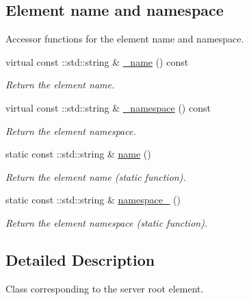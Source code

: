 \subsection*{Element name and namespace}
\label{_amgrpd4b5b61f6e07390f4af2465e04571f34}
Accessor functions for the element name and namespace. \begin{DoxyCompactItemize}
\item 
virtual const ::std::string \& \hyperlink{classopenstack_1_1xml_1_1Server___acbdfdc448bff8a494f3624eefa3484c5}{\_\-name} () const 
\begin{DoxyCompactList}\small\item\em Return the element name. \item\end{DoxyCompactList}\item 
virtual const ::std::string \& \hyperlink{classopenstack_1_1xml_1_1Server___accc402dc6fad597cadc73760b1fe778f}{\_\-namespace} () const 
\begin{DoxyCompactList}\small\item\em Return the element namespace. \item\end{DoxyCompactList}\item 
static const ::std::string \& \hyperlink{classopenstack_1_1xml_1_1Server___a959e3268a8156de90faefb8fd46a4e0f}{name} ()
\begin{DoxyCompactList}\small\item\em Return the element name (static function). \item\end{DoxyCompactList}\item 
static const ::std::string \& \hyperlink{classopenstack_1_1xml_1_1Server___af61131597d9476a71c9bc0b9f04b7f7b}{namespace\_\-} ()
\begin{DoxyCompactList}\small\item\em Return the element namespace (static function). \item\end{DoxyCompactList}\end{DoxyCompactItemize}


\subsection{Detailed Description}
Class corresponding to the server root element. 

